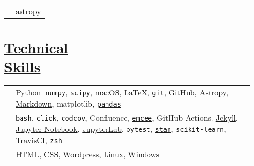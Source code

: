 \documentclass[margin]{res}
\begin{document}
\begin{resume}
\begin{tabular}{l p{4.3in}}
\hspace{-1em}{\bf Community Member:} & 
\href{https://github.com/astropy/astropy/issues/4976}{astropy} %
\end{tabular}








\newpage
\section{\href{https://github.com/benjaminrose}{Technical \\Skills}}

\hspace{1pt}
\begin{tabular}{l p{4.5in}}

\hspace{-1em}{\bf Daily Use:} & 
\href{https://www.python.org}{Python},
\texttt{numpy},
\texttt{scipy},
macOS,
\LaTeX,
\href{https://git-scm.com}{\texttt{git}},
\href{https://github.com/benjaminrose}{GitHub},
\href{http://www.astropy.org}{Astropy},
\href{http://daringfireball.net/projects/markdown/}{Markdown},
matplotlib,
\href{http://pandas.pydata.org}{\texttt{pandas}}
\\

\hspace{-1em}{\bf Proficient:} & 
\texttt{bash},
\texttt{click},
\texttt{codcov},
Confluence,
\href{http://dan.iel.fm/emcee/current/}{\texttt{emcee}},
GitHub Actions,
\href{https://jekyllrb.com}{Jekyll},
\href{http://jupyter.org}{Jupyter Notebook},
\href{https://jupyterlab.readthedocs.io/en/stable/}{JupyterLab},
\texttt{pytest},
\href{http://mc-stan.org}{\texttt{stan}},
\texttt{scikit-learn},
TravisCI,
\texttt{zsh}
\\

\hspace{-1em}{\bf Competent:} & HTML,
CSS,
Wordpress,
Linux,
Windows %
\end{tabular}














\end{resume}
\end{document}
